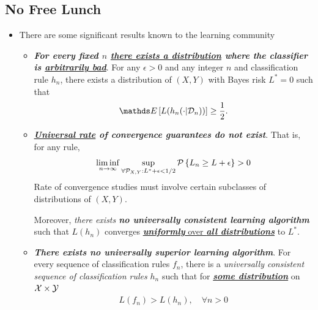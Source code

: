 \documentclass[11pt]{article}
\begin{document}
\subsection{No Free Lunch}
\begin{itemize}
\item \begin{remark} 
There are some significant results known to the learning community
\begin{itemize}
\item \emph{\textbf{For every fixed $n$ \underline{there exists a distribution} where the classifier is \underline{arbitrarily bad}}}. For any $\epsilon > 0$ and any integer $n$ and classification rule $h_n$, there exists a distribution of $(X, Y)$ with Bayes risk $L^{*} = 0$ such that
\begin{align*}
\E{}{L(h_n(\cdot|\cD_n))} \ge \frac{1}{2}.
\end{align*}

\item \emph{\textbf{\underline{Universal rate} of convergence guarantees do not exist}}. 
That is, for any rule,
\begin{align*}
\liminf\limits_{n \rightarrow \infty} \sup_{\forall {\mathcal P}_{X, Y}: L^{*} + \epsilon < 1/2}{\mathcal P}\left\{L_n \ge L + \epsilon\right\} > 0
\end{align*} 
Rate of convergence studies must involve certain subclasses of distributions of $(X, Y)$. 

Moreover, \emph{there exists \textbf{no universally consistent learning algorithm}} such that $L(h_n)$ converges \underline{\emph{\textbf{uniformly}} over \emph{\textbf{all distributions}}} to $L^{*}$.

\item \emph{\textbf{There exists no universally superior learning algorithm}}. For every sequence of classification rules $f_n$, there is a \emph{universally consistent
sequence of classification rules} $h_n$ such that for \underline{\emph{\textbf{some distribution}}} on ${\mathcal X} \times {\mathcal Y}$
\begin{align*}
L(f_n) > L(h_n), \quad \forall n >0
\end{align*}
\end{itemize}
\end{remark}
\end{itemize}
\end{document}

